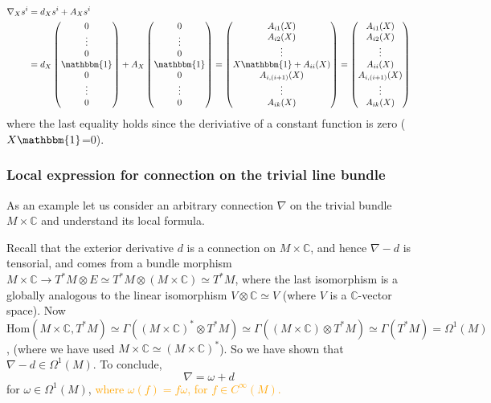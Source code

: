 \documentclass[a4paper]{article}
\theoremstyle{definition} \newtheorem*{definition}{Definition}
\theoremstyle{definition} \newtheorem*{definitions}{Definitions}
\theoremstyle{plain} \newtheorem{theorem}{Theorem}[section]
\theoremstyle{plain} \newtheorem{proposition}[theorem]{Proposition}
\theoremstyle{plain} \newtheorem{corollary}[theorem]{Corollary}
\theoremstyle{plain} \newtheorem{lemma}[theorem]{Lemma}
\theoremstyle{plain} \newtheorem{example}[theorem]{Example}
\newcommand{\understandBetter}[1]{\textcolor{orange}{#1}}
\newcommand{\complexnos}{\mathbb{C}}
\newcommand{\Hom}{\text{Hom}}
\newcommand{\smooth}{C^\infty}
\begin{document}
\begin{align*}
    \nabla_X s^i & = d_X s^i + A_X s^i \\
    & = d_X \begin{pmatrix}0 \\ \vdots \\ 0 \\ \mathbbm{1} \\ 0 \\ \vdots \\ 0\end{pmatrix} +
     A_X \begin{pmatrix}0 \\ \vdots \\ 0 \\ \mathbbm{1} \\ 0 \\ \vdots \\ 0\end{pmatrix} 
     = \begin{pmatrix}A_{i1}(X) \\ A_{i2}(X) \\ \vdots \\ X\mathbbm{1} + A_{ii}(X)\\ A_{i, (i+1)}(X) \\ \vdots \\ A_{ik}(X)\end{pmatrix} 
     = \begin{pmatrix}A_{i1}(X) \\ A_{i2}(X) \\ \vdots \\ A_{ii}(X)\\ A_{i, (i+1)}(X) \\ \vdots \\ A_{ik}(X)\end{pmatrix} 
\end{align*}
where the last equality holds since the deriviative of a constant function is zero ($X\mathbbm{1}$=0).

\subsubsection{Local expression for connection on the trivial line bundle}
As an example let us consider an arbitrary connection $\nabla$ on the trivial bundle $M\times \complexnos$ and understand its local formula. 

Recall that the exterior derivative $d$ is a connection on $M\times \complexnos$, and hence $\nabla - d$ is tensorial, and comes from a bundle morphism $M\times \complexnos\to T^*M\otimes E \simeq T^*M\otimes (M\times \complexnos)\simeq T^* M$, where the last isomorphism is a globally analogous to the linear isomorphism $V\otimes \complexnos\simeq V$ (where $V$ is a $\complexnos$-vector space). 
Now $\Hom(M\times \complexnos, T^*M)\simeq \Gamma((M\times \complexnos)^*\otimes T^*M)\simeq \Gamma((M\times \complexnos)\otimes T^*M) \simeq \Gamma(T^*M) = \Omega^1(M)$, (where we have used $M\times \complexnos \simeq (M\times \complexnos)^*$). So we have shown that $\nabla - d\in \Omega^1(M)$. To conclude,
$$\nabla = \omega + d$$
for $\omega \in \Omega^1(M)$, \understandBetter{where $\omega(f)=f\omega$, for $f\in \smooth(M)$.} 
\end{document}
